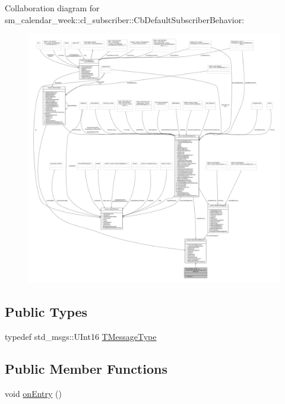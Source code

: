 Collaboration diagram for sm\+\_\+calendar\+\_\+week\+:\+:cl\+\_\+subscriber\+:\+:Cb\+Default\+Subscriber\+Behavior\+:
\nopagebreak
\begin{figure}[H]
\begin{center}
\leavevmode
\includegraphics[width=350pt]{classsm__calendar__week_1_1cl__subscriber_1_1CbDefaultSubscriberBehavior__coll__graph}
\end{center}
\end{figure}
\subsection*{Public Types}
\begin{DoxyCompactItemize}
\item 
typedef std\+\_\+msgs\+::\+U\+Int16 \hyperlink{classsm__calendar__week_1_1cl__subscriber_1_1CbDefaultSubscriberBehavior_ae1be7627d27b2fdabdb25190fdc94a0e}{T\+Message\+Type}
\end{DoxyCompactItemize}
\subsection*{Public Member Functions}
\begin{DoxyCompactItemize}
\item 
void \hyperlink{classsm__calendar__week_1_1cl__subscriber_1_1CbDefaultSubscriberBehavior_ab92e1f50bb88e3b47c2ee4520fecb719}{on\+Entry} ()
\end{DoxyCompactItemize}


